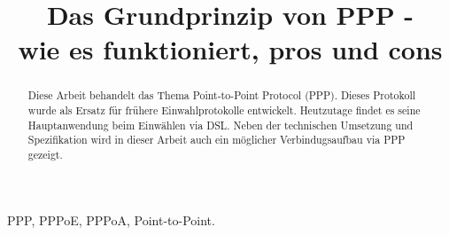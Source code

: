\documentclass[journal,11pt]{IEEEtran}
\begin{document}
 
\title{Das Grundprinzip von PPP - \\wie es funktioniert, pros und cons} 
\author{
 }
\maketitle 
\begin{abstract} 
Diese Arbeit behandelt das Thema Point-to-Point Protocol (PPP). Dieses Protokoll wurde als Ersatz f\"ur fr\"uhere Einwahlprotokolle entwickelt. Heutzutage findet es seine Hauptanwendung beim Einw\"ahlen via DSL. Neben der technischen Umsetzung und Spezifikation wird in dieser Arbeit auch ein m\"oglicher Verbindugsaufbau via PPP gezeigt.
\end{abstract} 
\begin{IEEEkeywords} 
PPP, PPPoE, PPPoA, Point-to-Point. 
\end{IEEEkeywords}
\end{document}
